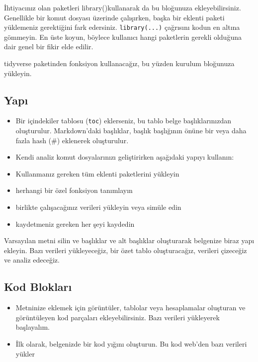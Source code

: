 \documentclass[
  oneside]{book}
\begin{document}
İhtiyacınız olan paketleri {{library}{(}{)}}kullanarak da bu bloğunuza ekleyebilirsiniz. Genellikle bir komut dosyası üzerinde çalışırken, başka bir eklenti paketi yüklemeniz gerektiğini fark edersiniz. \texttt{library(...)} çağrısını kodun en altına gömmeyin. En üste koyun, böylece kullanıcı hangi paketlerin gerekli olduğuna dair genel bir fikir elde edilir.

\begin{try}
tidyverse paketinden fonksiyon kullanacağız, bu yüzden kurulum bloğunuza yükleyin.

\end{try}

\hypertarget{yapux131}{%
\subsection{Yapı}\label{yapux131}}

\begin{itemize}
\item
  Bir içindekiler tablosu (\texttt{toc}) eklerseniz, bu tablo belge başlıklarınızdan oluşturulur. Markdown'daki başlıklar, başlık başlığının önüne bir veya daha fazla hash (\#) eklenerek oluşturulur.
\item
  Kendi analiz komut dosyalarınızı geliştirirken aşağıdaki yapıyı kullanın:
\item
  Kullanmanız gereken tüm eklenti paketlerini yükleyin
\item
  herhangi bir özel fonksiyon tanımlayın
\item
  birlikte çalışacağınız verileri yükleyin veya simüle edin
\item
  kaydetmeniz gereken her şeyi kaydedin
\end{itemize}

\begin{try}
Varsayılan metni silin ve başlıklar ve alt başlıklar oluşturarak belgenize biraz yapı ekleyin. Bazı verileri yükleyeceğiz, bir özet tablo oluşturacağız, verileri çizeceğiz ve analiz edeceğiz.

\end{try}

\hypertarget{kod-bloklarux131}{%
\subsection{Kod Blokları}\label{kod-bloklarux131}}

\begin{itemize}
\item
  Metninize eklemek için görüntüler, tablolar veya hesaplamalar oluşturan ve görüntüleyen kod parçaları ekleyebilirsiniz. Bazı verileri yükleyerek başlayalım.
\item
  İlk olarak, belgenizde bir kod yığını oluşturun. Bu kod web'den bazı verileri yükler
\end{itemize}
\end{document}
